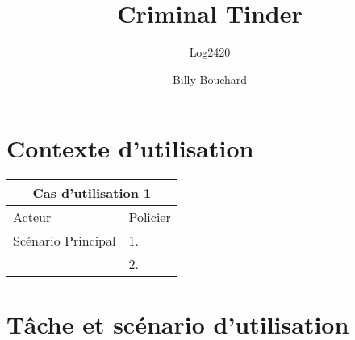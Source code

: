 \documentclass[12pt]{article}
\title{Criminal Tinder}
\subtitle{Log2420}
\author{Billy Bouchard}{Jacob Dorais}{Thien Nguyen}{Pascale Chayer}{François-Xavier Legault}
\begin{document}
\maketitle
\section{Contexte d'utilisation}
\begin{tabular}{| l | l |}
 \hline
 \multicolumn{2}{|c|}{Cas d'utilisation 1} \\ \hline
 Acteur              & Policier \\ \hline
 Scénario Principal & 1.       \\
                     & 2.       \\ \hline
\end{tabular}
\section{Tâche et scénario d'utilisation}
\end{document}

